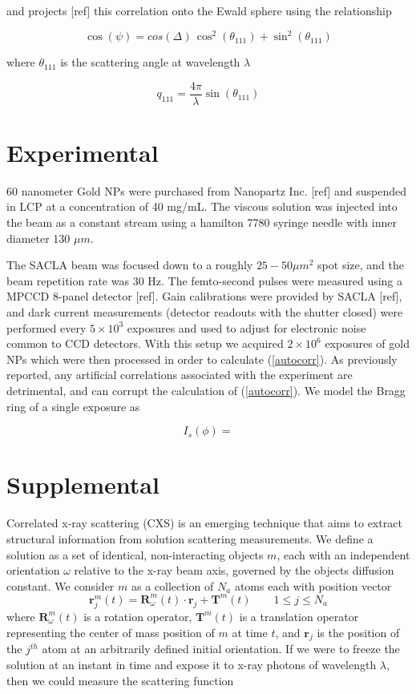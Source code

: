 \documentclass [11pt,fleqn]{article}
\def \be {\begin{equation}}
\def \ee {\end{equation}}
\begin{document}
and projects [ref] this correlation onto the Ewald sphere using the relationship

\be
\cos( \psi) = cos( \Delta ) \, \cos ^2 ( \theta_{111} )  + \sin ^2(\theta_{111} )  
\ee

where $\theta_{111}$ is the scattering angle at wavelength $\lambda$

\be
q_{111} = \frac{ 4\pi }{\lambda } \sin (\theta_{111})  
\ee


\section{Experimental}
60 nanometer Gold NPs were purchased from Nanopartz Inc. [ref] and suspended in LCP at a concentration of 40 mg/mL. The viscous solution was injected into the beam as a constant stream using a  hamilton 7780 syringe needle with inner diameter 130 $\mu m$.

The SACLA beam was focused down to a roughly $25 − 50 \mu m ^2$ spot size, and the beam repetition rate was 30 Hz. The femto-second pulses were measured using a MPCCD 8-panel detector [ref]. Gain calibrations were provided by SACLA [ref], and dark current measurements (detector readouts with the shutter closed) were performed every $5\times 10^3$ exposures and used to adjust for electronic noise common to CCD detectors. With this setup we acquired $2\times 10^6$ exposures of gold NPs which were then processed in order to calculate (\ref{autocorr}). As previously reported, any artificial correlations associated with the experiment are detrimental, and can corrupt the calculation of (\ref {autocorr}). We model the Bragg ring of a single exposure as

\be
I_s( \phi ) = 
\ee
\section{Supplemental}
Correlated x-ray scattering (CXS) is an emerging technique that aims to extract structural information from solution scattering measurements. We define a solution as a set of identical, non-interacting objects $m$, each with an independent orientation $\omega$ relative to the x-ray beam axis, governed by the objects diffusion constant. We consider $m$ as a collection of $N_a$ atoms each with position vector 
\be
\bm r^m_j (t) = \bm R^m_\omega (t)\cdot \bm r_j + \bm T^m(t) \qquad 1 \le j \le N_a
\ee 
where $\bm R^m_\omega(t)$ is a rotation operator, $\bm T^m (t)$ is a translation operator representing the center of mass position of $m$ at time $t$, and $\bm r_j$ is the position of the $j^{th}$ atom at an arbitrarily defined initial orientation. If we were to freeze the solution at an instant in time and expose it to x-ray photons of wavelength $\lambda$, then we could measure the scattering function
\end{document}
